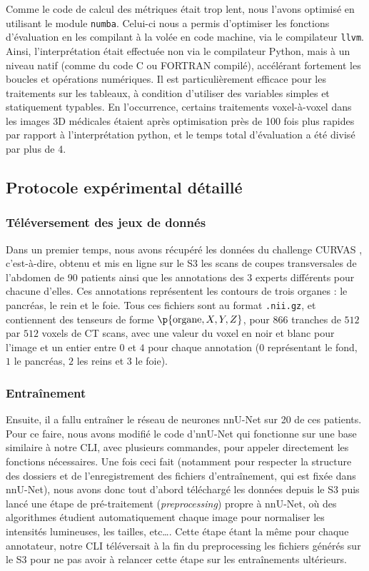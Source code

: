 \documentclass[a4paper,french,bookmarks,12pt]{article}
\begin{document}
    Comme le code de calcul des métriques était trop lent, nous l'avons optimisé en utilisant le module \texttt{numba}. Celui-ci nous a permis d'optimiser les fonctions d'évaluation en les compilant à la volée en code machine, via le compilateur \texttt{llvm}. Ainsi, l'interprétation était effectuée non via le compilateur Python, mais à un niveau natif (comme du code C ou FORTRAN compilé), accélérant fortement les boucles et opérations numériques. Il est particulièrement efficace pour les traitements sur les tableaux, à condition d'utiliser des variables simples et statiquement typables. En l’occurrence, certains traitements voxel-à-voxel dans les images 3D médicales étaient après optimisation près de 100 fois plus rapides par rapport à l'interprétation python, et le temps total d'évaluation a été divisé par plus de 4.
    
    \subsection{Protocole expérimental détaillé}

    \subsubsection*{Téléversement des jeux de donnés}
    
    Dans un premier temps, nous avons récupéré les données du challenge \textsc{CURVAS} \parencite{curvas},  c'est-à-dire, obtenu et mis en ligne sur le S3 les scans de coupes transversales de l'abdomen de 90 patients ainsi que les annotations des 3 experts différents pour chacune d'elles. Ces annotations représentent les contours de trois organes : le pancréas, le rein et le foie. Tous ces fichiers sont au format \texttt{.nii.gz}, et contiennent des tenseurs de forme $\p{\text{organe}, X, Y, Z}$, pour $866$ tranches de $512$ par $512$ voxels de CT scans, avec une valeur du voxel en noir et blanc pour l'image et un entier entre $0$ et $4$ pour chaque annotation ($0$ représentant le fond, $1$ le pancréas, $2$ les reins et $3$ le foie).

    \subsubsection*{Entraînement}

    Ensuite, il a fallu entraîner le réseau de neurones nnU-Net sur 20 de ces patients. Pour ce faire, nous avons modifié le code d'nnU-Net qui fonctionne sur une base similaire à notre CLI, avec plusieurs commandes, pour appeler directement les fonctions nécessaires. Une fois ceci fait (notamment pour respecter la structure des dossiers et de l'enregistrement des fichiers d'entraînement, qui est fixée dans nnU-Net), nous avons donc tout d'abord téléchargé les données depuis le S3 puis lancé une étape de pré-traitement (\emph{preprocessing}) propre à nnU-Net, où des algorithmes étudient automatiquement chaque image pour normaliser les intensités lumineuses, les tailles, etc\dots. Cette étape étant la même pour chaque annotateur, notre CLI téléversait à la fin du preprocessing les fichiers générés sur le S3 pour ne pas avoir à relancer cette étape sur les entraînements ultérieurs. 
    
\end{document}

